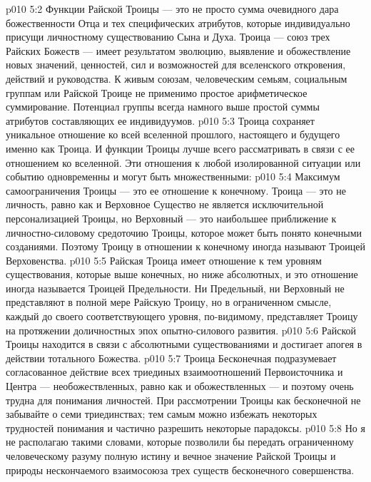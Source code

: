 \vs p010 5:2 Функции Райской Троицы --- это не просто сумма очевидного дара божественности Отца и тех специфических атрибутов, которые индивидуально присущи личностному существованию Сына и Духа. Троица --- союз трех Райских Божеств --- имеет результатом эволюцию, выявление и обожествление новых значений, ценностей, сил и возможностей для вселенского откровения, действий и руководства. К живым союзам, человеческим семьям, социальным группам или Райской Троице не применимо простое арифметическое суммирование. Потенциал группы всегда намного выше простой суммы атрибутов составляющих ее индивидуумов.
\vs p010 5:3 \pc Троица сохраняет уникальное отношение ко всей вселенной прошлого, настоящего и будущего именно как Троица. И функции Троицы лучше всего рассматривать в связи с ее отношением ко вселенной. Эти отношения к любой изолированной ситуации или событию одновременны и могут быть множественными:
\vs p010 5:4 \pc {}\bibnobreakspace {} Максимум самоограничения Троицы --- это ее отношение к конечному. Троица --- это не личность, равно как и Верховное Существо не является исключительной персонализацией Троицы, но Верховный --- это наибольшее приближение к личностно\hyp{}силовому средоточию Троицы, которое может быть понято конечными созданиями. Поэтому Троицу в отношении к конечному иногда называют Троицей Верховенства.
\vs p010 5:5 \pc {}\bibnobreakspace {} Райская Троица имеет отношение к тем уровням существования, которые выше конечных, но ниже абсолютных, и это отношение иногда называется Троицей Предельности. Ни Предельный, ни Верховный не представляют в полной мере Райскую Троицу, но в ограниченном смысле, каждый до своего соответствующего уровня, по\hyp{}видимому, представляет Троицу на протяжении доличностных эпох опытно\hyp{}силового развития.
\vs p010 5:6 \pc {}\bibnobreakspace {} Райской Троицы находится в связи с абсолютными существованиями и достигает апогея в действии тотального Божества.
\vs p010 5:7 \pc Троица Бесконечная подразумевает согласованное действие всех триединых взаимоотношений Первоисточника и Центра --- необожествленных, равно как и обожествленных --- и поэтому очень трудна для понимания личностей. При рассмотрении Троицы как бесконечной не забывайте о семи триединствах; тем самым можно избежать некоторых трудностей понимания и частично разрешить некоторые парадоксы.
\vs p010 5:8 \pc Но я не располагаю такими словами, которые позволили бы передать ограниченному человеческому разуму полную истину и вечное значение Райской Троицы и природы нескончаемого взаимосоюза трех существ бесконечного совершенства.
